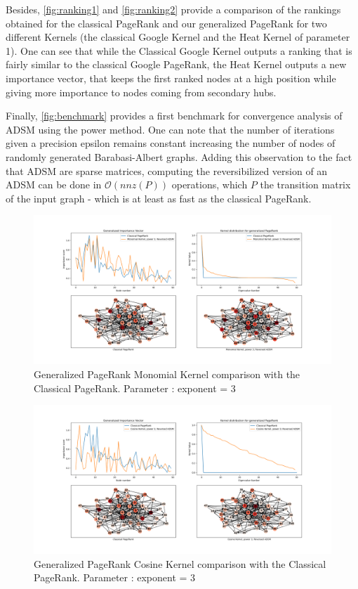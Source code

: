 \documentclass{article}
\begin{document}
Besides, \ref{fig:ranking1} and \ref{fig:ranking2} provide a comparison of the rankings obtained for the classical PageRank and our generalized PageRank for two different Kernels (the classical Google Kernel and the Heat Kernel of parameter 1). One can see that while the Classical Google Kernel outputs a ranking that is fairly similar to the classical Google PageRank, the Heat Kernel outputs a new importance vector, that keeps the first ranked nodes at a high position while giving more importance to nodes coming from secondary hubs.

Finally, \ref{fig:benchmark} provides a first benchmark for convergence analysis of ADSM using the power method. One can note that the number of iterations given a precision epsilon remains constant increasing the number of nodes of randomly generated Barabasi-Albert graphs. Adding this observation to the fact that ADSM are sparse matrices, computing the reversibilized version of an ADSM can be done in $\mathcal{O}(nnz(P))$ operations, which $P$ the transition matrix of the input graph - which is at least as fast as the classical PageRank. 

\begin{figure}[h!]
    \centering
    \centerline{
    \includegraphics[width= 1.55\textwidth]{results_figures/monomial_kernel_3.png}
    }
    \caption{Generalized PageRank Monomial Kernel comparison with the Classical PageRank. Parameter : exponent = 3}
    \label{fig:monomialK3}
\end{figure}

\begin{figure}[h!]
    \centering
    \centerline{
    \includegraphics[width= 1.55\textwidth]{results_figures/cosine_kernel_3.png}
    }
    \caption{Generalized PageRank Cosine Kernel comparison with the Classical PageRank. Parameter : exponent = 3}
    \label{fig:cosineK3}
\end{figure}
\end{document}
